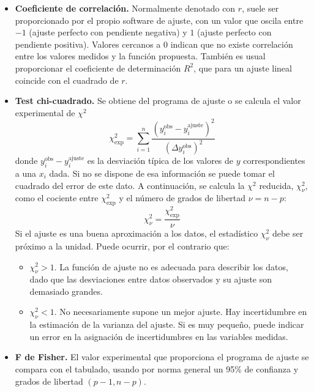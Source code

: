 \documentclass{book}
\begin{document}
\begin{itemize}
  \item \textbf{Coeficiente de correlación.} Normalmente denotado con $r$, suele ser proporcionado
  por el propio software de ajuste, con un valor que oscila entre $-1$ (ajuste perfecto con
  pendiente negativa) y $1$ (ajuste perfecto con pendiente positiva). Valores cercanos a $0$ 
  indican que no existe correlación entre los valores medidos y la función propuesta.
  También es usual proporcionar el coeficiente de determinación $R^2$, que para un ajuste lineal 
  coincide con el cuadrado de $r$.
  \item \textbf{Test chi-cuadrado.} Se obtiene del programa de ajuste o se calcula el valor
  experimental de $\chi^2$
  \begin{equation}
    \chi_{\textrm{exp}}^2 = \sum_{i=1}^n \frac{(y_i^{\textrm{obs}} - y_i^{\textrm{ajuste}})^2}{(\Delta y_i^{\textrm{obs}})^2}
  \end{equation}
  donde $y_i^{\textrm{obs}} - y_i^{\textrm{ajuste}}$ es la desviación típica de los valores de $y$
  correspondientes a una $x_i$ dada. Si no se dispone de esa información se puede tomar el cuadrado
  del error de este dato. A continuación, se calcula la $\chi^2$ reducida, $\chi^2_{\nu}$, como el
  cociente entre $\chi_{\textrm{exp}}^2$ y el número de grados de libertad $\nu = n - p$:
  \begin{equation}
    \chi^2_{\nu} = \frac{\chi_{\textrm{exp}}^2}{\nu}
  \end{equation}
  Si el ajuste es una buena aproximación a los datos, el estadístico $\chi^2_{\nu}$ debe ser próximo 
  a la unidad. Puede ocurrir, por el contrario que:
  \begin{itemize}
    \item $\chi^2_{\nu} > 1$. La función de ajuste no es adecuada para describir los datos, dado que
    las desviaciones entre datos observados y su ajuste son demasiado grandes.
    \item $\chi^2_{\nu} < 1$. No necesariamente supone un mejor ajuste. Hay incertidumbre en la estimación
    de la varianza del ajuste. Si es muy pequeño, puede indicar un error en la asignación de incertidumbres
    en las variables medidas.
  \end{itemize}

  \item \textbf{F de Fisher.} El valor experimental que proporciona el programa de ajuste se compara
  con el tabulado, usando por norma general un 95\% de confianza y grados de libertad $(p-1, n-p)$.
\end{itemize}
\end{document}
